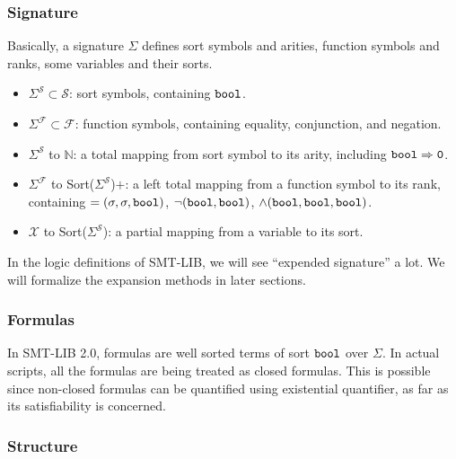 \documentclass[10pt,twocolumn,letter]{article}
\theoremstyle{definition}
\begin{document}
\subsubsection{Signature}

Basically, a signature $\Sigma$ defines sort symbols and arities, function symbols and ranks, some variables and their sorts.

\begin{itemize}
\item $\Sigma^\mathcal{S} \subset \mathcal{S}$: sort symbols, containing $\tt bool$.
\item $\Sigma^\mathcal{F} \subset \mathcal{F}$: function symbols, containing equality, conjunction, and negation.
\item $\Sigma^\mathcal{S}$ to $\mathbb{N}$: a total mapping from sort symbol to its arity, including $\tt bool \Rightarrow 0$.
\item $\Sigma^\mathcal{F}$ to Sort($\Sigma^\mathcal{S}$)$+$: a left total mapping from a function symbol to its rank, containing $=(\sigma, \sigma, {\tt bool} )$, $\neg({\tt bool},{\tt bool})$, $\wedge ({\tt bool}, {\tt bool}, {\tt bool})$.
\item $\mathcal{X}$ to Sort($\Sigma^\mathcal{S}$): a partial mapping from a variable to its sort.
\end{itemize}

In the logic definitions of SMT-LIB, we will see ``expended signature'' a lot. We will formalize the expansion methods in later sections.

\subsubsection{Formulas}

In SMT-LIB 2.0, formulas are well sorted terms of sort $\tt bool$ over $\Sigma$. In actual scripts, all the formulas are being treated as closed formulas. This is possible since non-closed formulas can be quantified using existential quantifier, as far as its satisfiability is concerned.

\subsubsection{Structure}
\end{document}
